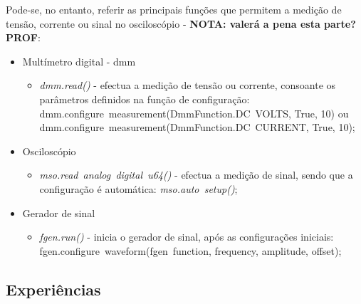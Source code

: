 Pode-se, no entanto, referir as principais funções que permitem a medição de tensão, corrente ou sinal no osciloscópio \cite{pyvirtualbench} - \textbf{NOTA: valerá a pena esta parte? PROF}:

\begin{itemize}
	\item Multímetro digital - \acrshort{dmm}
		\begin{itemize}
			\item \textit{dmm.read()} - efectua a medição de tensão ou corrente, consoante os parâmetros definidos na função de configuração: dmm.configure~\textunderscore measurement(DmmFunction.DC~\textunderscore VOLTS, True, 10) ou dmm.configure~\textunderscore measurement(DmmFunction.DC~\textunderscore CURRENT, True, 10);
		\end{itemize}
	\item Osciloscópio
	\begin{itemize}
		\item \textit{mso.read~\textunderscore analog~\textunderscore digital~\textunderscore u64()} - efectua a medição de sinal, sendo que a configuração é automática: \textit{mso.auto~\textunderscore setup()};
	\end{itemize}
	\item Gerador de sinal
	\begin{itemize}
		\item \textit{fgen.run()} - inicia o gerador de sinal, após as configurações iniciais:\\fgen.configure~\textunderscore waveform(fgen~\textunderscore function, frequency, amplitude, offset);
	\end{itemize}
\end{itemize}

\subsection{Experiências}
\label{sec:experiências}



